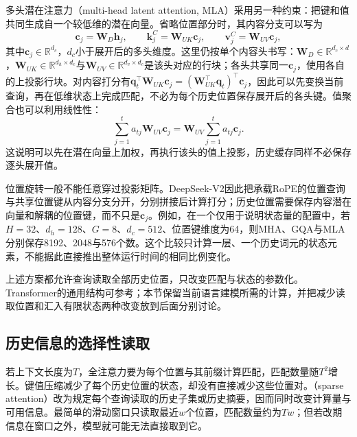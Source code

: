 多头潜在注意力（multi-head latent attention, MLA）采用另一种约束：把键和值共同生成自一个较低维的潜在向量。省略位置部分时，其内容分支可以写为
\begin{equation}
 \bm c_j=\bm W_D\bm h_j,\qquad
 \bm k_j^{C}=\bm W_{UK}\bm c_j,\qquad
 \bm v_j^{C}=\bm W_{UV}\bm c_j,
 \label{eq:nlp-llm-mla}
\end{equation}
其中$\bm c_j\in\mathbb R^{d_c}$，$d_c$小于展开后的多头维度。这里仍按单个内容头书写：$\bm W_D\in\mathbb R^{d_c\times d}$，$\bm W_{UK}\in\mathbb R^{d_h\times d_c}$与$\bm W_{UV}\in\mathbb R^{d_v\times d_c}$是该头对应的行块；各头共享同一$\bm c_j$，使用各自的上投影行块。对内容打分有$\bm q_t^{\top}\bm W_{UK}\bm c_j=(\bm W_{UK}^{\top}\bm q_t)^{\top}\bm c_j$，因此可以先变换当前查询，再在低维状态上完成匹配，不必为每个历史位置保存展开后的各头键。值聚合也可以利用线性性：
\begin{equation}
 \sum_{j=1}^{t}a_{tj}\bm W_{UV}\bm c_j
 =\bm W_{UV}\sum_{j=1}^{t}a_{tj}\bm c_j.
 \label{eq:nlp-llm-mla-value}
\end{equation}
这说明可以先在潜在向量上加权，再执行该头的值上投影，历史缓存同样不必保存逐头展开值。

位置旋转一般不能任意穿过投影矩阵。DeepSeek-V2因此把承载RoPE的位置查询与共享位置键从内容分支分开，分别拼接后计算打分；历史位置需要保存内容潜在向量和解耦的位置键，而不只是$\bm c_j$。例如，在一个仅用于说明状态量的配置中，若$H=32$、$d_h=128$、$G=8$、$d_c=512$、位置键维度为64，则MHA、GQA与MLA分别保存8192、2048与576个数。这个比较只计算一层、一个历史词元的状态元素，不能据此直接推出整体运行时间的相同比例变化。

上述方案都允许查询读取全部历史位置，只改变匹配与状态的参数化。Transformer的通用结构可参考；本节保留当前语言建模所需的计算，并把减少读取位置和汇入有限状态两种改变放到后面分别讨论。

\subsection{历史信息的选择性读取}
\label{sec:nlp-llm-sparse-reading}

若上下文长度为$T$，全注意力要为每个位置与其前缀计算匹配，匹配数量随$T^2$增长。键值压缩减少了每个历史位置的状态，却没有直接减少这些位置对。（sparse attention）改为规定每个查询读取的历史子集或历史摘要，因而同时改变计算量与可用信息。最简单的滑动窗口只读取最近$w$个位置，匹配数量约为$Tw$；但若改期信息在窗口之外，模型就可能无法直接取到它。

